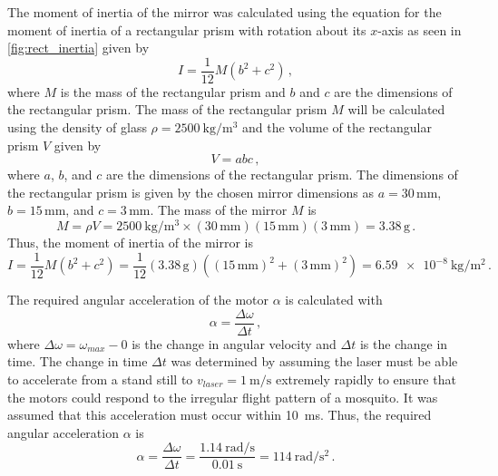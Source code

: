 The moment of inertia of the mirror was calculated using the equation for the moment of inertia of a rectangular prism with rotation about its $x$-axis as seen in \autoref{fig:rect_inertia} given by
\begin{equation}
    I = \frac{1}{12}M\left(b^2 + c^2\right)\,,
\end{equation}
where $M$ is the mass of the rectangular prism and $b$ and $c$ are the dimensions of the rectangular prism. The mass of the rectangular prism $M$ will be calculated using the density of glass $\rho = \SI{2500}{\kg\per\meter\cubed}$ and the volume of the rectangular prism $V$ given by
\begin{equation}
    V = abc\,,
\end{equation}
where $a$, $b$, and $c$ are the dimensions of the rectangular prism. The dimensions of the rectangular prism is given by the chosen mirror dimensions as $a = 30\,\text{mm}$, $b = 15\,\text{mm}$, and $c = 3\,\text{mm}$. The mass of the mirror $M$ is
\begin{equation}
    M = \rho V = \SI{2500}{\kg\per\meter\cubed} \times (30\,\text{mm})(15\,\text{mm})(3\,\text{mm}) = 3.38\,\text{g}\,.
\end{equation}
Thus, the moment of inertia of the mirror is
\begin{equation}
    I = \frac{1}{12}M\left(b^2 + c^2\right) = \frac{1}{12}(3.38\,\text{g})\left((15\,\text{mm})^2 + (3\,\text{mm})^2\right) = \SI{6.59e-8}{\kg\per\meter\squared}\,.
\end{equation}

The required angular acceleration of the motor $\alpha$ is calculated with
\begin{equation}
    \alpha = \frac{\Delta\omega}{\Delta t}\,,
\end{equation}
where $\Delta\omega = \omega_{max} - 0$ is the change in angular velocity and $\Delta t$ is the change in time. The change in time $\Delta t$ was determined by assuming the laser must be able to accelerate from a stand still to $v_{laser} = \SI{1}{\meter\per\second}$ extremely rapidly to ensure that the motors could respond to the irregular flight pattern of a mosquito. It was assumed that this acceleration must occur within 10~ms. Thus, the required angular acceleration $\alpha$ is
\begin{equation}
    \alpha = \frac{\Delta\omega}{\Delta t} = \frac{\SI{1.14}{\radian\per\second}}{\SI{0.01}{\second}} = \SI{114}{\radian\per\second\squared}\,.
\end{equation}


